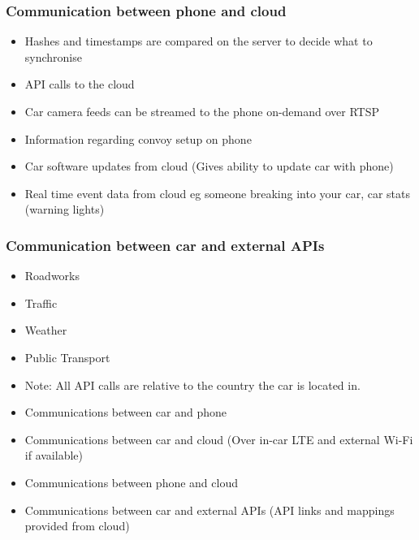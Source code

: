 \documentclass{article}
\begin{document}
\subsubsection{Communication between phone and cloud}
        \begin{itemize}
        	\item Hashes and timestamps are compared on the server to decide what to synchronise
            \item API calls to the cloud
            \item Car camera feeds can be streamed to the phone on-demand over RTSP
            \item Information regarding convoy setup on phone
            \item Car software updates from cloud (Gives ability to update car with phone)
            \item Real time event data from cloud eg someone breaking into your car, car stats (warning lights)
        \end{itemize}
\subsubsection{Communication between car and external APIs}
        \begin{itemize}
        	\item Roadworks
            \item Traffic
            \item Weather
            \item Public Transport
            \item Note: All API calls are relative to the country the car is located in.
        \end{itemize}
        
  	\begin{itemize}
      \item Communications between car and phone

	  \item Communications between car and cloud (Over in-car LTE and external Wi-Fi if available)

      \item Communications between phone and cloud

	  \item Communications between car and external APIs (API links and mappings provided from cloud)
	\end{itemize}
\end{document}
